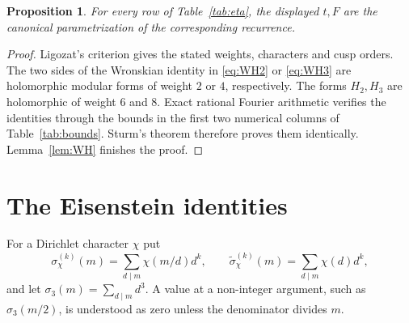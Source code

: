 \documentclass[11pt]{article}
\newtheorem{proposition}[theorem]{Proposition}
\theoremstyle{remark}
\newcommand{\sigin}[2]{\sigma_{#1}^{(#2)}}
\newcommand{\sigout}[2]{\widetilde\sigma_{#1}^{(#2)}}
\begin{document}
\begin{proposition}\label{prop:eta-canonical}
For every row of Table~\ref{tab:eta}, the displayed $t,F$ are the canonical
parametrization of the corresponding recurrence.
\end{proposition}

\begin{proof}
Ligozat's criterion gives the stated weights, characters and cusp orders.
The two sides of the Wronskian identity in \eqref{eq:WH2} or
\eqref{eq:WH3} are holomorphic modular forms of weight $2$ or $4$,
respectively.  The forms $H_2,H_3$ are holomorphic of weight $6$ and $8$.
Exact rational Fourier arithmetic verifies the identities through the bounds
in the first two numerical columns of Table~\ref{tab:bounds}.  Sturm's theorem
therefore proves them identically.  Lemma~\ref{lem:WH} finishes the proof.
\end{proof}

\section{The Eisenstein identities}

For a Dirichlet character $\chi$ put
\[
 \sigin{\chi}{k}(m)=\sum_{d\mid m}\chi(m/d)d^k,
 \qquad
 \sigout{\chi}{k}(m)=\sum_{d\mid m}\chi(d)d^k,
\]
and let $\sigma_3(m)=\sum_{d\mid m}d^3$.  A value at a non-integer argument,
such as $\sigma_3(m/2)$, is understood as zero unless the denominator divides
$m$.
\end{document}
